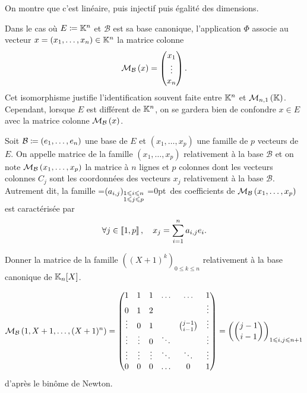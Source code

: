 \documentclass{magnolia}
\begin{document}
\begin{preuve}
On montre que c'est linéaire, puis injectif puis égalité des dimensions.
\end{preuve}

\begin{remarqueUnique}
\remarque Dans le cas où $E\coloneqq\mathbb{K}^n$ et $\mathcal{B}$ est sa base canonique,
  l'application
  $\Phi$ associe au vecteur $x=(x_1,\ldots,x_n)\in\mathbb{K}^n$ la matrice colonne
  \[\mathcal{M}_{\mathcal{B}}\left(x\right)=
    \begin{pmatrix}
    x_1\\ \vdots\\x_n
    \end{pmatrix}.\]
  Cet isomorphisme justifie l'identification souvent faite entre $\mathbb{K}^n$ et
  $\mathcal{M}_{n,1}\left(\mathbb{K}\right)$.
  Cependant, lorsque $E$ est différent de $\mathbb{K}^n$, on se gardera bien de
  confondre $x\in E$ avec la matrice colonne $\mathcal{M}_{\mathcal{B}}\left(x\right)$.
\end{remarqueUnique}


\begin{definition}[utile=-3]
Soit $\mathcal{B}\coloneqq(e_1,\ldots,e_n)$ une base de $E$ et $(x_1,\ldots,x_p)$ une
famille de $p$ vecteurs de $E$. On appelle matrice de la famille
$(x_1,\ldots,x_p)$
relativement à la base $\mathcal{B}$ et on note $\mathcal{M}_{\mathcal{B}}\left(x_1,\ldots,x_p\right)$
la matrice à $n$ lignes et $p$ colonnes dont les vecteurs colonnes $C_j$ sont les
coordonnées des vecteurs $x_j$ relativement à la base $\mathcal{B}$.
Autrement dit, la famille
=\hbox{$\left(a_{i,j}\right)_{\substack{1\leqslant i\leqslant n\\ 1\leqslant j \leqslant p}}$}
=0pt\ des coefficients de $\mathcal{M}_{\mathcal{B}}\left(x_1,\ldots,x_p\right)$ est
caractérisée par
\[\forall j\in\left\llbracket 1,p\right\rrbracket ,\quad x_j=\sum_{i=1}^n a_{i,j}e_i.\]
\end{definition}

\begin{exoUnique}
\exo Donner la matrice de la famille $((X+1)^k)_{0\leq k\leq n}$
  relativement à la base canonique de $\polyK[n]$.
  \begin{sol}
  \[\mathcal{M}_{\mathcal{B}}\left(1,X+1,\ldots,(X+1)^n\right)=
    \begin{pmatrix}
    1&1&1&\ldots&\ldots&1\\0&1&2&&&\vdots\\\vdots&0&1&&\binom{j-1}{i-1}&\vdots\\\vdots&\vdots&0&\ddots&&\vdots\\\vdots&\vdots&\vdots&\ddots&\ddots&\vdots\\0&0&0&\ldots&0&1
    \end{pmatrix}=\left(\binom{j-1}{i-1}\right)_{1\leqslant i,j\leqslant n+1}\]
    d'après le binôme de Newton.
  
  \end{sol}
\end{exoUnique}
\end{document}
